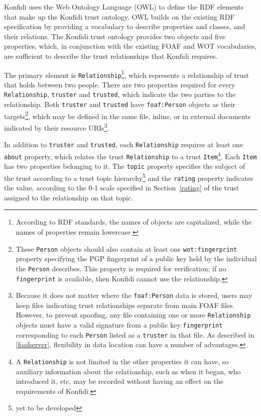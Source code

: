 \documentclass{acm_proc_article-sp}
\begin{document}
Konfidi uses the Web Ontology Language (OWL)\cite{owl} to define the RDF elements that make up the Konfidi trust ontology.  OWL builds on the existing RDF specification by providing a vocabulary to describe properties and classes, and their relations.  The Konfidi trust ontology provides two objects and five properties, which, in conjunction with the existing FOAF and WOT vocabularies, are sufficient to describe the trust relationships that Konfidi requires.


The primary element is \texttt{Relationship}\footnote{According to RDF standards, the names of objects are capitalized, while the names of properties remain lowercase.}, which represents a relationship of trust that holds between two people.  There are two properties required for every \texttt{Relationship}, \texttt{truster} and \texttt{trusted}, which indicate the two parties to the relationship.  Both \texttt{truster} and \texttt{trusted} have \texttt{foaf:Person} objects as their targets\footnote{These \texttt{Person} objects should also contain at least one \texttt{wot:fingerprint} property specifying the PGP fingerprint of a public key held by the individual the \texttt{Person} describes.  This property is required for verification; if no \texttt{fingerprint} is available, then Konfidi cannot use the relationship.}, which may be defined in the same file, inline, or in external documents indicated by their resource URIs\footnote{Because it does not matter where the \texttt{foaf:Person} data is stored, users may keep files indicating trust relationships separate from main FOAF files.  However, to prevent spoofing, any file containing one or more \texttt{Relationship} objects must have a valid signature from a public key \texttt{fingerprint} corresponding to each \texttt{Person} listed as a \texttt{truster} in that file.  As described in \ref{foafserver}, flexibility in data location can have a number of advantages. }.  

In addition to \texttt{truster} and \texttt{trusted}, each \texttt{Relationship} requires at least one \texttt{about} property, which relates the trust \texttt{Relationship} to a trust \texttt{Item}\footnote{A \texttt{Relationship} is not limited in the other properties it can have, so auxiliary information about the relationship, such as when it began, who introduced it, etc. may be recorded without having an effect on the requirements of Konfidi.}.  Each \texttt{Item} has two properties belonging to it.  The \texttt{topic} property specifies the subject of the trust according to a trust topic hierarchy\footnote{yet to be developed} and the \texttt{rating} property indicates the value, according to the 0-1 scale specified in Section~\ref{rating} of the trust assigned to the relationship on that topic.  
\end{document}
